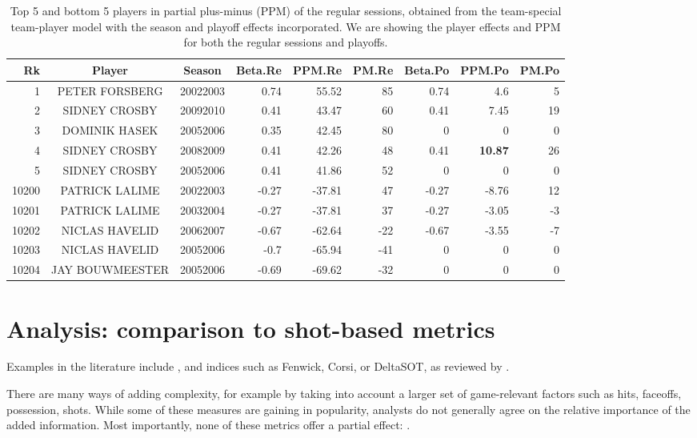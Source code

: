 {
    \renewcommand{\arraystretch}{1.2}
\begin{table}[htbp]
    \centering
    \small
    \begin{tabular}{rccrrrrrr}
        \hline
        Rk    & Player & Season & Beta.Re  & \textbf{PPM}.Re  & PM.Re & Beta.Po & PPM.Po & PM.Po \\
        \hline
        1     & PETER FORSBERG & 20022003 & 0.74  & 55.52 & 85 & 0.74  & 4.6 & 5\\
        2     & SIDNEY CROSBY & 20092010 & 0.41  & 43.47 & 60 & 0.41  & 7.45 & 19\\
        3     & DOMINIK HASEK & 20052006 & 0.35  & 42.45 & 80 & 0     & 0 & 0 \\
        4     & SIDNEY CROSBY & 20082009 & 0.41  & 42.26 & 48 & 0.41  & \textbf{10.87} & 26 \\
        5     & SIDNEY CROSBY & 20052006 & 0.41  & 41.86 & 52 & 0     & 0  & 0\\
        10200 & PATRICK LALIME & 20022003 & -0.27 & -37.81& 47 & -0.27 & -8.76 & 12\\
        10201 & PATRICK LALIME & 20032004 & -0.27 & -37.81& 37 & -0.27 & -3.05 & -3\\
        10202 & NICLAS HAVELID & 20062007 & -0.67 & -62.64 & -22 & -0.67 & -3.55 & -7 \\
        10203 & NICLAS HAVELID & 20052006 & -0.7  & -65.94 & -41 & 0     & 0 & 0\\
        10204 & JAY BOUWMEESTER & 20052006 & -0.69 & -69.62 & -32 & 0     & 0 &0\\
        \hline
    \end{tabular}%
    \caption{Top 5 and bottom 5 players in partial plus-minus (PPM) of the regular sessions, obtained from the team-special team-player model with the season and playoff effects incorporated. We are showing the player effects and PPM for both the regular sessions and playoffs.}\label{tab:goal.ppm.ranking.inter}
\end{table}
}

\section{Analysis: comparison to shot-based metrics}
\label{sec:shots}

Examples in
the literature include , and indices
such as Fenwick, Corsi, or DeltaSOT, as reviewed by \cite{vol10}. 

There are many
ways of adding complexity, for example by taking into account a larger set of
game-relevant factors such as hits, faceoffs, possession, shots.   While some
of these measures are gaining in popularity, analysts do not generally agree
on the relative importance of the added information.  Most importantly, none
of these metrics offer a partial effect: .


